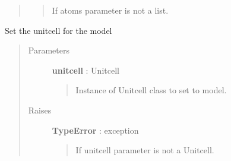 \documentclass[letterpaper,10pt,english]{sphinxmanual}
\begin{document}
\begin{fulllineitems}
\begin{fulllineitems}
\begin{quote}
\begin{description}
\begin{quote}
If atoms parameter is not a list.
\end{quote}

\end{description}\end{quote}

\end{fulllineitems}


\begin{fulllineitems}
\label{modules:phaseshifts.model.Model.set_unitcell}
Set the unitcell for the model
\begin{quote}\begin{description}
\item[{Parameters}] \leavevmode
\textbf{unitcell} : Unitcell
\begin{quote}

Instance of Unitcell class to set to model.
\end{quote}

\item[{Raises}] \leavevmode
\textbf{TypeError} : exception
\begin{quote}

If unitcell parameter is not a Unitcell.
\end{quote}

\end{description}\end{quote}

\end{fulllineitems}


\end{fulllineitems}

\end{document}
